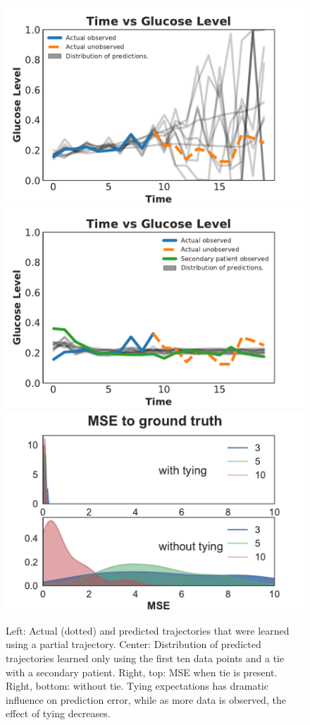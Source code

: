 \begin{figure}[!htb]
	\centering
	\includegraphics[width=0.30\linewidth, trim={1.cm, 0.1cm, 1.3cm, .5cm}, clip]{figures/rnnsamples-no-tie-py}
	\includegraphics[width=.30\linewidth, trim={1.cm, 0.1cm, 1.3cm, .5cm}, clip]{figures/rnnsamples-py}
	\includegraphics[width=0.30\linewidth, trim={0.7cm, 0.0cm, .7cm, .1cm}, clip]{figures/mse}
		
		\caption{Left: Actual (dotted) and predicted trajectories that were learned using a partial trajectory. Center: Distribution of predicted trajectories learned only using the first ten data points and a tie with a secondary patient. Right, top: MSE when tie is present.  Right, bottom: without tie.  Tying expectations has dramatic influence on prediction error, while as more data is observed, the effect of tying decreases.}
		\label{fig:rnn-samples}
\end{figure}





